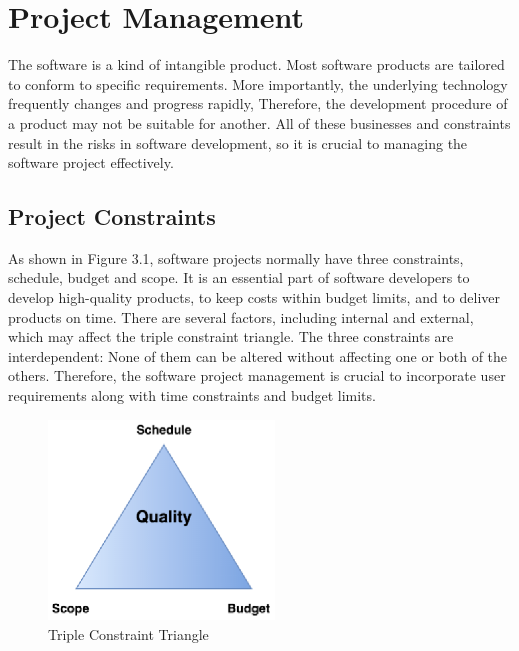 
\chapter{Project Management} \label{Chapter:Project Management}

The software is a kind of intangible product. Most software products are tailored to conform to specific requirements. More importantly, the underlying technology frequently changes and progress rapidly, Therefore, the development procedure of a product may not be suitable for another. All of these businesses and constraints result in the risks in software development, so it is crucial to managing the software project effectively. 


\section{Project Constraints}



As shown in Figure 3.1, software projects normally have three constraints, schedule, budget and scope. It is an essential part of software developers to develop high-quality products, to keep costs within budget limits, and to deliver products on time. There are several factors, including internal and external, which may affect the triple constraint triangle. The three constraints are interdependent: None of them can be altered without affecting one or both of the others. Therefore, the software project management is crucial to incorporate user requirements along with time constraints and budget limits.


\begin{figure}[H]
  \centering
  \includegraphics[width=6cm]{./img/Picture1}
  \caption{Triple Constraint Triangle}
  \label{Figure:figex}
\end{figure}


